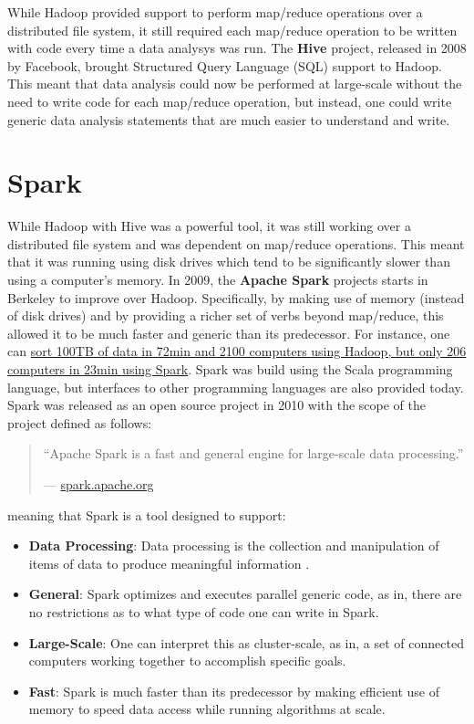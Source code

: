 \documentclass[]{book}
\providecommand{\tightlist}{%
  \setlength{\itemsep}{0pt}\setlength{\parskip}{0pt}}
\theoremstyle{definition}
\theoremstyle{definition}
\theoremstyle{definition}
\theoremstyle{remark}
\begin{document}
While Hadoop provided support to perform map/reduce operations over a
distributed file system, it still required each map/reduce operation to
be written with code every time a data analysys was run. The
\textbf{Hive} project, released in 2008 by Facebook, brought Structured
Query Language (SQL) support to Hadoop. This meant that data analysis
could now be performed at large-scale without the need to write code for
each map/reduce operation, but instead, one could write generic data
analysis statements that are much easier to understand and write.

\hypertarget{spark}{%
\section{Spark}\label{spark}}

While Hadoop with Hive was a powerful tool, it was still working over a
distributed file system and was dependent on map/reduce operations. This
meant that it was running using disk drives which tend to be
significantly slower than using a computer's memory. In 2009, the
\textbf{Apache Spark} projects starts in Berkeley to improve over
Hadoop. Specifically, by making use of memory (instead of disk drives)
and by providing a richer set of verbs beyond map/reduce, this allowed
it to be much faster and generic than its predecessor. For instance, one
can
\href{https://databricks.com/blog/2014/11/05/spark-officially-sets-a-new-record-in-large-scale-sorting.html}{sort
100TB of data in 72min and 2100 computers using Hadoop, but only 206
computers in 23min using Spark}. Spark was build using the Scala
programming language, but interfaces to other programming languages are
also provided today. Spark was released as an open source project in
2010 with the scope of the project defined as follows:

\begin{quote}
``Apache Spark is a fast and general engine for large-scale data
processing.''

--- \href{http://spark.apache.org/}{spark.apache.org}
\end{quote}

meaning that Spark is a tool designed to support:

\begin{itemize}
\tightlist
\item
  \textbf{Data Processing}: Data processing is the collection and
  manipulation of items of data to produce meaningful information
  \citep{data-processing}.
\item
  \textbf{General}: Spark optimizes and executes parallel generic code,
  as in, there are no restrictions as to what type of code one can write
  in Spark.
\item
  \textbf{Large-Scale}: One can interpret this as cluster-scale, as in,
  a set of connected computers working together to accomplish specific
  goals.
\item
  \textbf{Fast}: Spark is much faster than its predecessor by making
  efficient use of memory to speed data access while running algorithms
  at scale.
\end{itemize}
\end{document}
